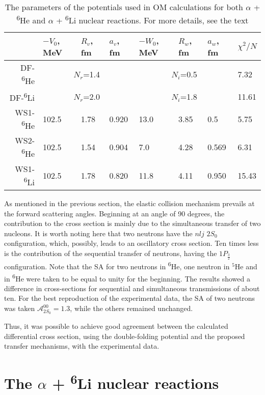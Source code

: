 \documentclass[
12pt, %
oneside, %
english, %
onehalfspacing, %
onehalfspacing, %
headsepline, %
]{MastersDoctoralThesis} %
\newcommand{\he}{\textsuperscript{6}He\xspace}
\newcommand{\li}{\textsuperscript{6}Li\xspace}
\begin{document}
\begin{table}[bp]
\footnotesize
\caption{The parameters of the potentials used in OM calculations for both $\alpha$ + \he and $\alpha$ + \li nuclear reactions. For more details, see the text}
\label{tab:he_elastic}
\begin{tabular*}{\textwidth}{@{\extracolsep{\fill}}rlllllll}
\hline
    & $-V_0$, MeV & $R_v$, fm & $a_v$, fm & $-W_0$, MeV & $R_w$, fm & $a_w$, fm & $\chi^2/N$ \\ \hline
DF-\he  & \multicolumn{3}{c}{$N_r$=1.4}        & \multicolumn{3}{c}{$N_i$=0.5}        & 7.32      \\
DF-\li  & \multicolumn{3}{c}{$N_r$=2.0}        & \multicolumn{3}{c}{$N_i$=1.8}        & 11.61      \\
WS1-\he & 102.5       & 1.78      & 0.920     & 13.0        & 3.85      & 0.5       & 5.75      \\
WS2-\he & 102.5       & 1.54      & 0.904     & 7.0         & 4.28      & 0.569     & 6.31      \\ 
WS1-\li & 102.5       & 1.78      & 0.820     & 11.8         & 4.11      & 0.950     & 15.43      \\
\hline
\end{tabular*}
\end{table}

As mentioned in the previous section, the elastic collision mechanism prevails at the forward scattering angles. Beginning at an angle of 90 degrees, the contribution to the cross section is mainly due to the simultaneous transfer of two nucleons. It is worth noting here that two neutrons have the $nlj$ $2S_0$ configuration, which, possibly, leads to an oscillatory cross section. Ten times less is the contribution of the sequential transfer of neutrons, having the $1P_{\frac{3}{2}}$ configuration. Note that the SA for two neutrons in \he, one neutron in $^5$He and in \he were taken to be equal to unity for the beginning. The results showed a difference in cross-sections for sequential and simultaneous transmissions of about ten. For the best reproduction of the experimental data, the SA of two neutrons was taken  $\mathcal{A}^{00}_{2S_0}=1.3$, while the others remained unchanged.

Thus, it was possible to achieve good agreement between the calculated differential cross section, using the double-folding potential and the proposed transfer mechanisms, with the experimental data.



\section{The $\alpha$ + \li nuclear reactions }
\end{document}
